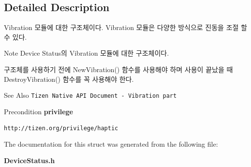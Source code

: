 \subsection{Detailed Description}
Vibration 모듈에 대한 구조체이다. Vibration 모듈은 다양한 방식으로 진동을 조절 할 수 있다. 

\begin{DoxyNote}{Note}
Device Status의 Vibration 모듈에 대한 구조체이다. \par
 구조체를 사용하기 전에 New\-Vibration() 함수를 사용해야 하며 사용이 끝났을 때 Destroy\-Vibration() 함수를 꼭 사용해야 한다. 
\end{DoxyNote}
\begin{DoxySeeAlso}{See Also}
{\tt Tizen Native A\-P\-I Document -\/ Vibration part} 
\end{DoxySeeAlso}
\begin{DoxyPrecond}{Precondition}
{\bfseries privilege} \par

\begin{DoxyItemize}
\item {\tt http\-://tizen.\-org/privilege/haptic} 
\end{DoxyItemize}
\end{DoxyPrecond}


The documentation for this struct was generated from the following file\-:\begin{DoxyCompactItemize}
\item 
{\bf Device\-Status.\-h}\end{DoxyCompactItemize}
